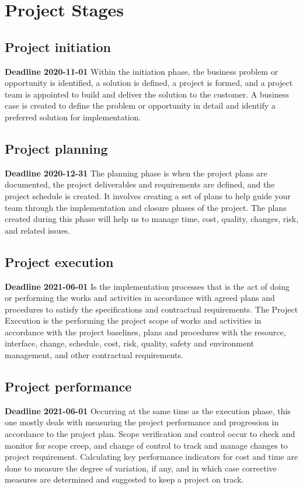 \documentclass{VUMIFPSkursinis}
\begin{document}
		

\section{Project Stages}

	\subsection{Project initiation}
	\textbf{Deadline 2020-11-01}
	Within the initiation phase, the business problem or opportunity is identified, a solution is defined, a project is formed, and a project team is appointed to build and deliver the solution to the customer. A business case is created to define the problem or opportunity in detail and identify a preferred solution for implementation. 
	\subsection{Project planning}
	\textbf{Deadline 2020-12-31}
	The planning phase is when the project plans are documented, the project deliverables and requirements are defined, and the project schedule is created. It involves creating a set of plans to help guide your team through the implementation and closure phases of the project. The plans created during this phase will help us to manage time, cost, quality, changes, risk, and related issues.
	\subsection{Project execution}
	\textbf{Deadline 2021-06-01}
	Is the implementation processes that is the act of doing or performing the works and activities in accordance with agreed plans and procedures to satisfy the specifications and contractual requirements. The Project Execution is the performing the project scope of works and activities in accordance with the project baselines, plans and procedures with the resource, interface, change, schedule, cost, risk, quality, safety and environment management, and other contractual requirements.
	\subsection{Project performance} 
	\textbf{Deadline 2021-06-01}
	Occurring at the same time as the execution phase, this one mostly deals with measuring the project performance and progression in accordance to the project plan. Scope verification and control occur to check and monitor for scope creep, and change of control to track and manage changes to project requirement. Calculating key performance indicators for cost and time are done to measure the degree of variation, if any, and in which case corrective measures are determined and suggested to keep a project on track.
\end{document}
